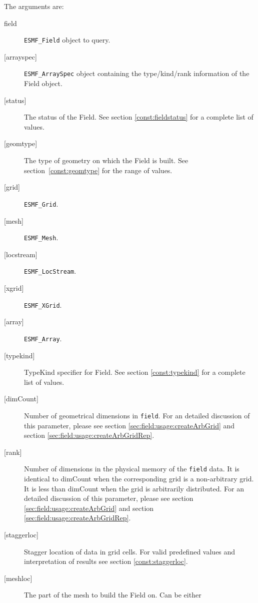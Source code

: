    The arguments are:
   \begin{description}
   \item [field]
   {\tt ESMF\_Field} object to query.
   \item[{[arrayspec]}]
   {\tt ESMF\_ArraySpec} object containing the type/kind/rank information
   of the Field object.
   \item [{[status]}]
   \begin{sloppypar}
   The status of the Field. See section \ref{const:fieldstatus} for a
   complete list of values.
   \end{sloppypar}
   \item [{[geomtype]}]
   The type of geometry on which the Field is built. See
   section~\ref{const:geomtype} for the range of values.
   \item [{[grid]}]
   {\tt ESMF\_Grid}.
   \item [{[mesh]}]
   \apiStatusCompatibleException
   {\tt ESMF\_Mesh}.
   \item [{[locstream]}]
   \apiStatusCompatibleException
   {\tt ESMF\_LocStream}.
   \item [{[xgrid]}]
   \apiStatusCompatibleException
   {\tt ESMF\_XGrid}.
   \item [{[array]}]
   {\tt ESMF\_Array}.
   \item [{[typekind]}]
   TypeKind specifier for Field. See section \ref{const:typekind} for a
   complete list of values.
   \item [{[dimCount]}]
   Number of geometrical dimensions in {\tt field}.
   For an detailed discussion of this parameter, please see
   section \ref{sec:field:usage:createArbGrid} and
   section \ref{sec:field:usage:createArbGridRep}.
   \item [{[rank]}]
   Number of dimensions in the physical memory of the {\tt field} data. It is
   identical to dimCount when the corresponding grid is a non-arbitrary grid.
   It is less than dimCount when the grid is arbitrarily distributed.
   For an detailed discussion of this parameter, please see
   section \ref{sec:field:usage:createArbGrid} and
   section \ref{sec:field:usage:createArbGridRep}.
   \item [{[staggerloc]}]
   Stagger location of data in grid cells. For valid
   predefined values and interpretation of results see
   section \ref{const:staggerloc}.
   \item [{[meshloc]}]
   \begin{sloppypar}
   \apiStatusCompatibleException
   The part of the mesh to build the Field on. Can be either

\end{sloppypar}
\end{description}
